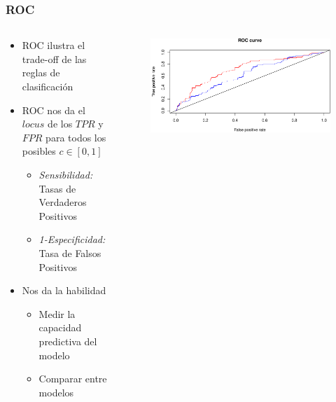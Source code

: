 \documentclass[
  shownotes,
  xcolor={svgnames},
  hyperref={colorlinks,citecolor=DarkBlue,linkcolor=DarkRed,urlcolor=DarkBlue}
  , aspectratio=169]{beamer}
\begin{document}
\begin{frame}[fragile]
\frametitle{ROC}



\begin{columns}[T] %
\begin{column}{.52\textwidth}
\begin{itemize}
\item ROC ilustra el trade-off de las reglas de clasificación
\medskip
\item ROC nos da el $locus $ de los $TPR$ y $FPR$ para todos los posibles $c\in[0,1]$
  \begin{itemize}
    \item {\it Sensibilidad:} Tasas de Verdaderos Positivos
    \item {\it 1-Especificidad:} Tasa de Falsos Positivos
    
  \end{itemize}
\item Nos da la habilidad
\begin{itemize}
  \item Medir la capacidad predictiva del modelo
  \medskip
  \item Comparar entre modelos
  
\end{itemize}
\end{itemize}
\end{column}  
\hfill
\begin{column}{.48\textwidth}

 \begin{figure}[H] \centering
            \captionsetup{justification=centering}
              \includegraphics[scale=0.38]{figures/unnamed-chunk-11-1.pdf}
 \end{figure}

\end{column}
\end{columns}



\end{frame}
\end{document}
